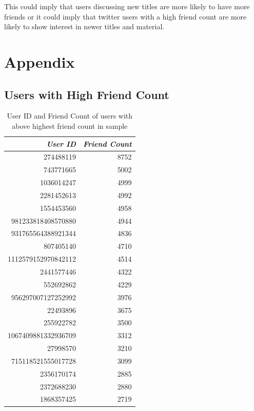 \documentclass[11pt]{article}
\begin{document}
This could imply that users discussing new titles are more likely to have more friends or it could imply that twitter users with a high friend count are more likely to show interest in newer titles and material.
\section{Appendix}
\label{sec:org371a403}
\subsection{Users with High Friend Count}
\label{sec:org4d57598}

\begin{table}[htbp]
\caption{\label{tab:orgddeb848}User ID and Friend Count of users with above highest friend count in sample}
\centering
\begin{tabular}{rr}
\textbf{\emph{User ID}} & \textbf{\emph{Friend Count}}\\
\hline
274488119 & 8752\\
743771665 & 5002\\
1036014247 & 4999\\
2281452613 & 4992\\
1554453560 & 4958\\
981233818408570880 & 4944\\
931765564388921344 & 4836\\
807405140 & 4710\\
1112579152970842112 & 4514\\
2441577446 & 4322\\
552692862 & 4229\\
956297007127252992 & 3976\\
22493896 & 3675\\
255922782 & 3500\\
1067409881332936709 & 3312\\
27998570 & 3210\\
715118521555017728 & 3099\\
2356170174 & 2885\\
2372688230 & 2880\\
1868357425 & 2719\\
\end{tabular}
\end{table}
\end{document}

